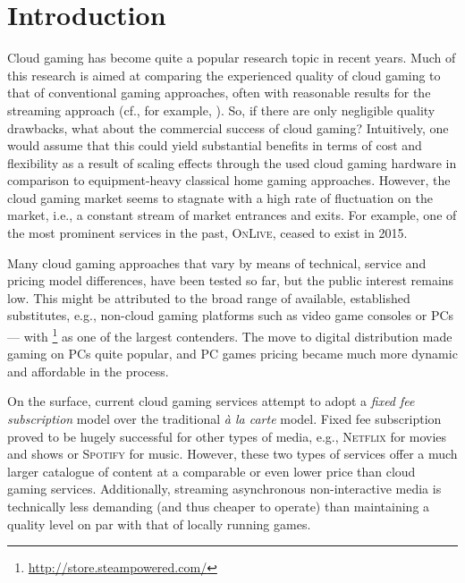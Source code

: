 
\section{Introduction}

Cloud gaming has become quite a popular research topic in recent years.
Much of this research is aimed at comparing the experienced quality of
cloud gaming to that of conventional gaming approaches, often with
reasonable results for the streaming approach (cf., for example,
\cite{5976180}). So, if there are only negligible quality drawbacks,
what about the commercial success of cloud gaming? Intuitively, one
would assume that this could yield substantial benefits in terms of cost
and flexibility as a result of scaling effects through the used cloud
gaming hardware in comparison to equipment-heavy classical home gaming
approaches. However, the cloud gaming market seems to stagnate with a
high rate of fluctuation on the market, i.e., a constant stream of
market entrances and exits. For example, one of the most prominent
services in the past, \textsc{OnLive}, ceased to exist in 2015.




Many cloud gaming approaches that vary by means of technical, service
and pricing model differences, have been tested so far, but the public
interest remains low. This might be attributed to the broad range of
available, established substitutes, e.g., non-cloud gaming platforms
such as video game consoles or PCs ---
with \steam\footnote{\url{http://store.steampowered.com/}} as one of the
largest contenders. The move to digital distribution made gaming on PCs
quite popular, and PC games pricing became much more dynamic and
affordable in the process.

On the surface, current cloud gaming services attempt to adopt a
\textit{fixed fee subscription} model over the traditional \textit{à la
carte} model. Fixed fee subscription proved to be hugely successful for
other types of media, e.g., \textsc{Netflix} for movies and shows or
\textsc{Spotify} for music. However, these two types of services offer a
much larger catalogue of content at a comparable or even lower price
than cloud gaming services. Additionally, streaming asynchronous
non-interactive media is technically less demanding (and thus cheaper to
operate) than maintaining a quality level on par with that of locally
running games.

